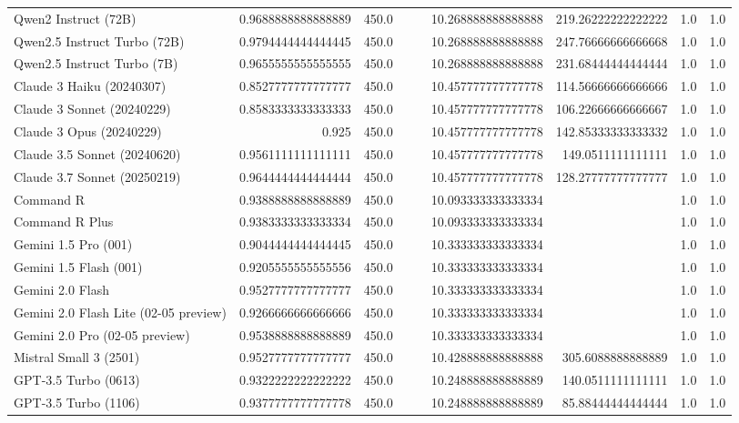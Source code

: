 \begin{table}[htp]
{\begin{tabular}{lrrrrrrrr}
Qwen2 Instruct (72B) & 0.9688888888888889 & 450.0 &  &  & 10.268888888888888 & 219.26222222222222 & 1.0 & 1.0 \\
Qwen2.5 Instruct Turbo (72B) & 0.9794444444444445 & 450.0 &  &  & 10.268888888888888 & 247.76666666666668 & 1.0 & 1.0 \\
Qwen2.5 Instruct Turbo (7B) & 0.9655555555555555 & 450.0 &  &  & 10.268888888888888 & 231.68444444444444 & 1.0 & 1.0 \\
Claude 3 Haiku (20240307) & 0.8527777777777777 & 450.0 &  &  & 10.457777777777778 & 114.56666666666666 & 1.0 & 1.0 \\
Claude 3 Sonnet (20240229) & 0.8583333333333333 & 450.0 &  &  & 10.457777777777778 & 106.22666666666667 & 1.0 & 1.0 \\
Claude 3 Opus (20240229) & 0.925 & 450.0 &  &  & 10.457777777777778 & 142.85333333333332 & 1.0 & 1.0 \\
Claude 3.5 Sonnet (20240620) & 0.9561111111111111 & 450.0 &  &  & 10.457777777777778 & 149.0511111111111 & 1.0 & 1.0 \\
Claude 3.7 Sonnet (20250219) & 0.9644444444444444 & 450.0 &  &  & 10.457777777777778 & 128.27777777777777 & 1.0 & 1.0 \\
Command R & 0.9388888888888889 & 450.0 &  &  & 10.093333333333334 &  & 1.0 & 1.0 \\
Command R Plus & 0.9383333333333334 & 450.0 &  &  & 10.093333333333334 &  & 1.0 & 1.0 \\
Gemini 1.5 Pro (001) & 0.9044444444444445 & 450.0 &  &  & 10.333333333333334 &  & 1.0 & 1.0 \\
Gemini 1.5 Flash (001) & 0.9205555555555556 & 450.0 &  &  & 10.333333333333334 &  & 1.0 & 1.0 \\
Gemini 2.0 Flash & 0.9527777777777777 & 450.0 &  &  & 10.333333333333334 &  & 1.0 & 1.0 \\
Gemini 2.0 Flash Lite (02-05 preview) & 0.9266666666666666 & 450.0 &  &  & 10.333333333333334 &  & 1.0 & 1.0 \\
Gemini 2.0 Pro (02-05 preview) & 0.9538888888888889 & 450.0 &  &  & 10.333333333333334 &  & 1.0 & 1.0 \\
Mistral Small 3 (2501) & 0.9527777777777777 & 450.0 &  &  & 10.428888888888888 & 305.6088888888889 & 1.0 & 1.0 \\
GPT-3.5 Turbo (0613) & 0.9322222222222222 & 450.0 &  &  & 10.248888888888889 & 140.0511111111111 & 1.0 & 1.0 \\
GPT-3.5 Turbo (1106) & 0.9377777777777778 & 450.0 &  &  & 10.248888888888889 & 85.88444444444444 & 1.0 & 1.0 \\

\end{tabular}}
\end{table}
